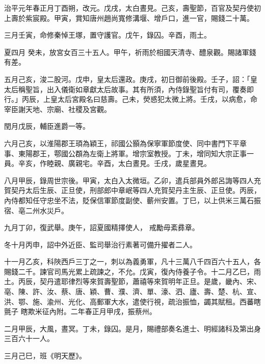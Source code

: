 \begin{pinyinscope}
 治平元年春正月丁酉朔，改元。戊戌，太白晝見。己亥，壽聖節，百官及契丹使初上壽於紫宸殿。甲寅，賞知唐州趙尚寬修溝堰、增戶口，進一官，賜錢二十萬。



 三月壬寅，命修秦悼王塚，置守護官。戊午，錄囚。辛酉，雨土。



 夏四月
 癸未，放宮女百三十五人。甲午，祈雨於相國天清寺、醴泉觀。賜諸軍錢有差。



 五月己亥，浚二股河。戊申，皇太后還政。庚戌，初日御前後殿。壬子，詔：「皇太后稱聖旨，出入儀衛如章獻太后故事。其有所須，內侍錄聖旨付有司，覆奏即行。」丙辰，上皇太后宮殿名曰慈壽。己未，熒惑犯太微上將。壬戌，以病愈，命宰臣謝天地、宗廟、社稷及宮觀。



 閏月戊辰，輔臣進爵一等。



 六月己亥，以淮陽郡王頊為穎王，祁國公顥為保寧軍節度使、同中書門下平章
 事、東陽郡王，鄠國公頵為左衛上將軍。增宗室教授。丁未，增同知大宗正事一員。辛亥，作睦親、廣親宅。辛酉，太白晝見。壬戌，歲星晝見。



 八月甲辰，錄周世宗後。甲寅，太白入太微垣。乙卯，遣兵部員外郎呂誨等四人充賀契丹太后生辰、正旦使，刑部郎中章岷等四人充賀契丹主生辰、正旦使。丙辰，內侍都知任守忠坐不法，貶保信軍節度副使、蘄州安置。丁巳，以上供米三萬石振宿、亳二州水災戶。



 九月丁卯，復武舉。庚午，詔夏國精擇使人，
 戒勵毋紊彞章。



 冬十月丙申，詔中外近臣、監司舉治行素著可備升擢者二人。



 十一月乙亥，科陜西戶三丁之一，刺以為義勇軍，凡十三萬八千四百六十五人，各賜錢二千。諫官司馬光累上疏諫之，不允。戊寅，復內侍養子令。十二月乙巳，雨土。丙辰，契丹遣耶律烈等來賀壽聖節，蕭禧等來賀明年正旦。是歲，畿內、宋、亳、陳、許、汝、蔡、唐、穎、曹、濮、濟、單、濠、泗、廬、壽、楚、杭、宣、洪、鄂、施、渝州、光化、高郵軍大水，遣使行視，疏治振恤，蠲其賦租。西蕃瞎氈子
 瞎欺米征內附。二年春正月甲戌，振蔡州。



 二月甲辰，大風，晝冥。丁未，錄囚。是月，賜禮部奏名進士、明經諸科及第出身三百六十一人。



 三月己巳，班《明天歷》。




\end{pinyinscope}

